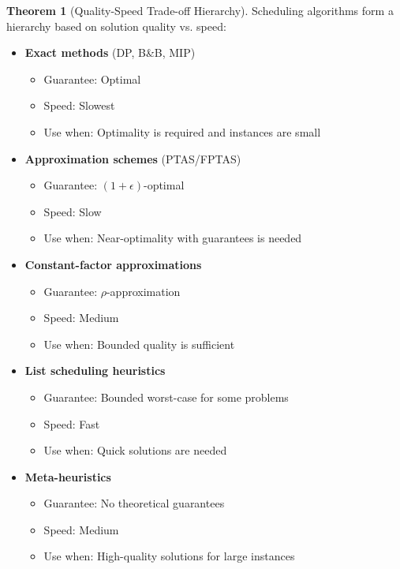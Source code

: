 \documentclass{article}
\theoremstyle{definition}
\newtheorem{theorem}{Theorem}
\begin{document}
\begin{theorem}[Quality-Speed Trade-off Hierarchy]
Scheduling algorithms form a hierarchy based on solution quality vs. speed:

\begin{itemize}
    \item \textbf{Exact methods} (DP, B\&B, MIP)
    \begin{itemize}
        \item Guarantee: Optimal
        \item Speed: Slowest
        \item Use when: Optimality is required and instances are small
    \end{itemize}
    
    \item \textbf{Approximation schemes} (PTAS/FPTAS)
    \begin{itemize}
        \item Guarantee: $(1+\epsilon)$-optimal
        \item Speed: Slow
        \item Use when: Near-optimality with guarantees is needed
    \end{itemize}
    
    \item \textbf{Constant-factor approximations}
    \begin{itemize}
        \item Guarantee: $\rho$-approximation
        \item Speed: Medium
        \item Use when: Bounded quality is sufficient
    \end{itemize}
    
    \item \textbf{List scheduling heuristics}
    \begin{itemize}
        \item Guarantee: Bounded worst-case for some problems
        \item Speed: Fast
        \item Use when: Quick solutions are needed
    \end{itemize}
    
    \item \textbf{Meta-heuristics}
    \begin{itemize}
        \item Guarantee: No theoretical guarantees
        \item Speed: Medium
        \item Use when: High-quality solutions for large instances
    \end{itemize}
    

\end{itemize}
\end{theorem}
\end{document}
